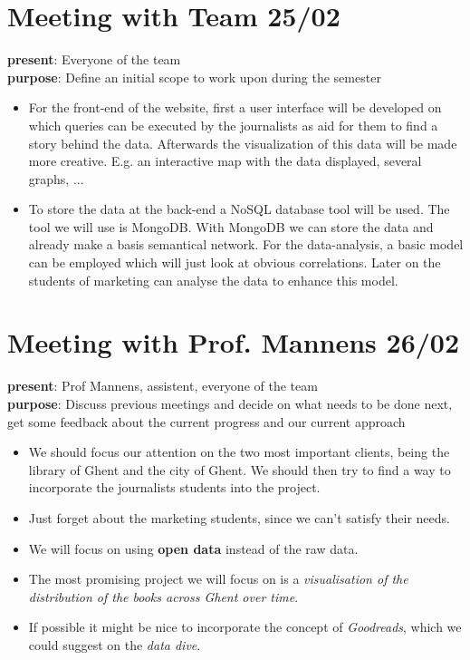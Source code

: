 \section{Meeting with Team 25/02}
{\bf present}: Everyone of the team\\
{\bf purpose}: Define an initial scope to work upon during the semester
\begin{itemize}
\item For the front-end of the website, first a user interface will be developed on which queries can be executed by the journalists as aid for them to find a story behind the data. Afterwards the visualization of this data will be made more creative. E.g. an interactive map with the data displayed, several graphs, ...
\item To store the data at the back-end a NoSQL database tool will be used. The tool we will use is MongoDB. With MongoDB we can store the data and already make a basis semantical network. For the data-analysis, a basic model can be employed which will just look at obvious correlations. Later on the students of marketing can analyse the data to enhance this model.
\end{itemize}

\section{Meeting with Prof. Mannens 26/02}
{\bf present}: Prof Mannens, assistent, everyone of the team\\
{\bf purpose}: Discuss previous meetings and decide on what needs to be done next, get some feedback about the current progress and our current approach\\
\begin{itemize}
  \item We should focus our attention on the two most important clients, being the library of Ghent and the city of Ghent. We should then try to find a way to incorporate the journalists students into the project.
  \item Just forget about the marketing students, since we can't satisfy their needs.
  \item We will focus on using \textbf{open data} instead of the raw data.
  \item The most promising project we will focus on is a \emph{visualisation of the distribution of the books across Ghent over time}.
  \item If possible it might be nice to incorporate the concept of \emph{Goodreads}, which we could suggest on the \emph{data dive}.
\end{itemize}

